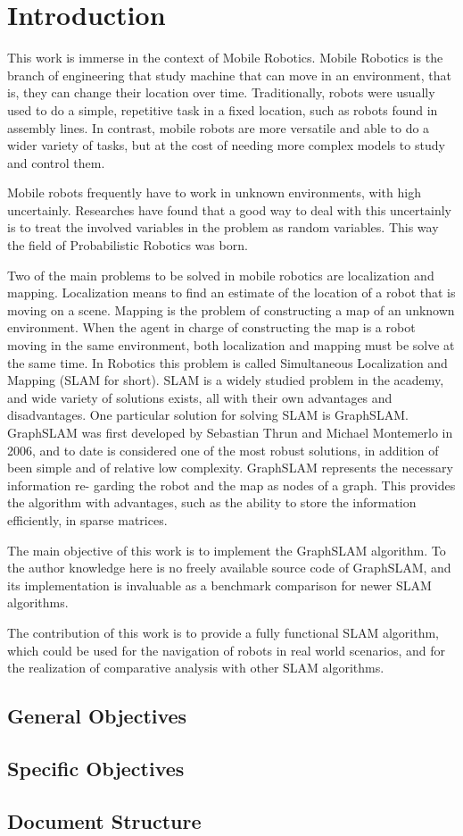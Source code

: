 \chapter{Introduction}

This work is immerse in the context of Mobile Robotics. Mobile
Robotics is the branch of engineering that study machine that can move in an
environment, that is, they can change their location over time. Traditionally,
robots were usually used to do a simple, repetitive task in a fixed location, such
as robots found in assembly lines. In contrast, mobile robots are more versatile
and able to do a wider variety of tasks, but at the cost of needing more complex
models to study and control them.

Mobile robots frequently have to work in unknown environments, with high
uncertainly. Researches have found that a good way to deal with this uncertainly
is to treat the involved variables in the problem as random variables. This way
the field of Probabilistic Robotics was born.

Two of the main problems to be solved in mobile robotics are localization and
mapping. Localization means to find an estimate of the location of a robot that is
moving on a scene. Mapping is the problem of constructing a map of an unknown
environment. When the agent in charge of constructing the map is a robot moving
in the same environment, both localization and mapping must be solve at the same
time. In Robotics this problem is called Simultaneous Localization and Mapping
(SLAM for short). SLAM is a widely studied problem in the academy, and wide
variety of solutions exists, all with their own advantages and disadvantages.
One particular solution for solving SLAM is GraphSLAM. GraphSLAM was
first developed by Sebastian Thrun and Michael Montemerlo in 2006, and to date
is considered one of the most robust solutions, in addition of been simple and
of relative low complexity. GraphSLAM represents the necessary information re-
garding the robot and the map as nodes of a graph. This provides the algorithm
with advantages, such as the ability to store the information efficiently, in sparse
matrices.

The main objective of this work is to implement the GraphSLAM
algorithm. To the author knowledge here is no freely available source code of
GraphSLAM, and its implementation is invaluable as a benchmark comparison for
newer SLAM algorithms.

The contribution of this work is to provide a fully functional SLAM
algorithm, which could be used for the navigation of robots in real world scenarios,
and for the realization of comparative analysis with other SLAM algorithms.

\section{General Objectives}

\section{Specific Objectives}

\section{Document Structure}
